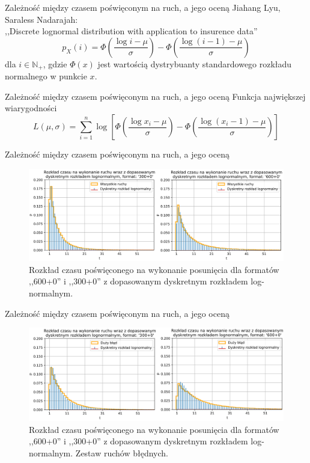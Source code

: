 \documentclass{beamer}
\begin{document}
\begin{frame}{Zależność między czasem poświęconym na ruch, a jego oceną}
Jiahang Lyu, Saraless Nadarajah:\\ ,,Discrete lognormal distribution with application to insurence data'' \cite{lognorm_disc}
	\begin{equation}\label{discrete}
		p_{X}(i)= \Phi\left(\frac{\log i - \mu}{\sigma} \right) - \Phi\left(\frac{\log \left(i - 1\right) - \mu}{\sigma} \right)
	\end{equation}
dla $i \in \mathbb{N}_+$,
gdzie $\Phi(x)$ jest wartością dystrybuanty standardowego rozkładu normalnego w punkcie $x$.
\end{frame}
\begin{frame}{Zależność między czasem poświęconym na ruch, a jego oceną}
	Funkcja największej wiarygodności
	\begin{equation}
		L(\mu,\sigma) = \sum_{i=1}^{n} \log\left[ \Phi\left(\frac{\log x_i - \mu}{\sigma} \right) - \Phi\left(\frac{\log \left(x_i - 1\right) - \mu}{\sigma} \right)\right]
	\end{equation}
\end{frame}
\begin{frame}{Zależność między czasem poświęconym na ruch, a jego oceną}
\begin{figure}[H]
	\centering
	\includegraphics[width=\textwidth]{../Formatka/discrete_lognorm_1.png}
	\caption{Rozkład czasu poświęconego na wykonanie posunięcia dla formatów ,,600+0'' i ,,300+0'' z dopasowanym dyskretnym rozkładem log-normalnym.}
	\label{rys:lognorm_disc}
\end{figure}
\end{frame}
\begin{frame}{Zależność między czasem poświęconym na ruch, a jego oceną}
	\begin{figure}[H]
		\centering
		\includegraphics[width=\textwidth]{../Formatka/discrete_lognorm_2.png}
		\caption{Rozkład czasu poświęconego na wykonanie posunięcia dla formatów ,,600+0'' i ,,300+0'' z dopasowanym dyskretnym rozkładem log-normalnym. Zestaw ruchów błędnych.}
		\label{rys:lognorm2_disc}
	\end{figure}
\end{frame}
\end{document}
